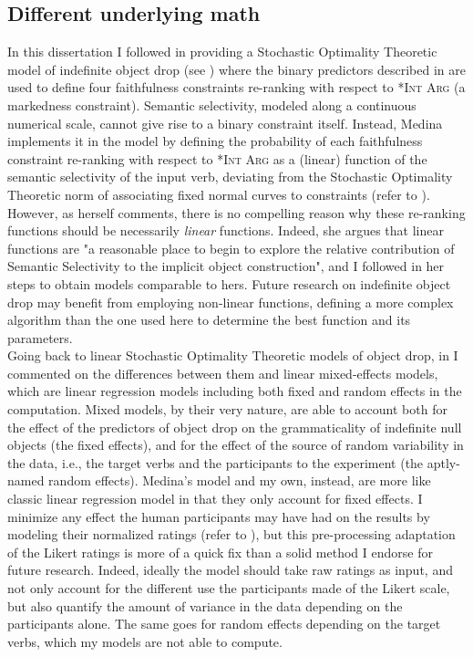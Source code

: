 

\subsection{Different underlying math}

In this dissertation I followed \textcite{Medina2007} in providing a Stochastic Optimality Theoretic model of indefinite object drop (see ) where the binary predictors described in  are used to define four faithfulness constraints re-ranking with respect to \textsc{*Int Arg} (a markedness constraint). Semantic selectivity, modeled along a continuous numerical scale, cannot give rise to a binary constraint itself. Instead, Medina implements it in the model by defining the probability of each faithfulness constraint re-ranking with respect to \textsc{*Int Arg} as a (linear) function of the semantic selectivity of the input verb, deviating from the Stochastic Optimality Theoretic norm of associating fixed normal curves to constraints (refer to ). However, as \textcite[110]{Medina2007} herself comments, there is no compelling reason why these re-ranking functions should be necessarily \textit{linear} functions. Indeed, she argues that linear functions are "a reasonable place to begin to explore the relative contribution of
Semantic Selectivity to the implicit object construction", and I followed in her steps to obtain models comparable to hers. Future research on indefinite object drop may benefit from employing non-linear functions, defining a more complex algorithm than the one used here to determine the best function and its parameters.\\
Going back to linear Stochastic Optimality Theoretic models of object drop, in  I commented on the differences between them and linear mixed-effects models, which are linear regression models including both fixed and random effects in the computation. Mixed models, by their very nature, are able to account both for the effect of the predictors of object drop on the grammaticality of indefinite null objects (the fixed effects), and for the effect of the source of random variability in the data, i.e., the target verbs and the participants to the experiment (the aptly-named random effects). Medina's model and my own, instead, are more like classic linear regression model in that they only account for fixed effects. I minimize any effect the human participants may have had on the results by modeling their normalized ratings (refer to ), but this pre-processing adaptation of the Likert ratings is more of a quick fix than a solid method I endorse for future research. Indeed, ideally the model should take raw ratings as input, and not only account for the different use the participants made of the Likert scale, but also quantify the amount of variance in the data depending on the participants alone. The same goes for random effects depending on the target verbs, which my models are not able to compute.

